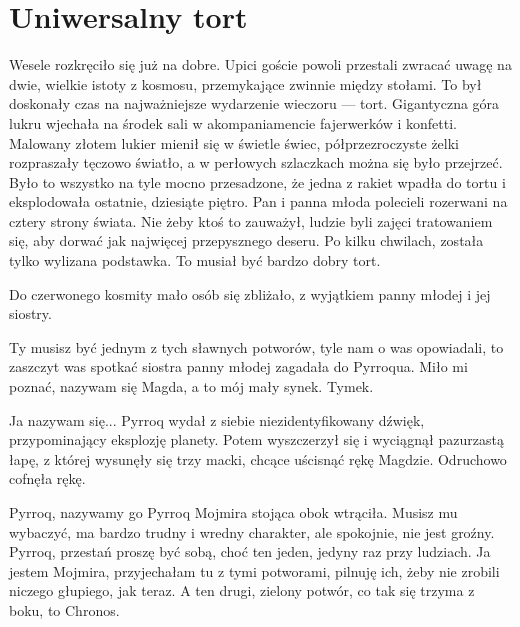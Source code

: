 \chapter{Uniwersalny tort}


Wesele rozkręciło się już na dobre. 
Upici goście powoli przestali zwracać uwagę na dwie, wielkie istoty z kosmosu, przemykające zwinnie między stołami.
To był doskonały czas na najważniejsze wydarzenie wieczoru --- tort.
Gigantyczna góra lukru wjechała na środek sali w akompaniamencie fajerwerków i konfetti. 
Malowany złotem lukier mienił się w świetle świec, półprzezroczyste żelki rozpraszały tęczowo światło, a w perłowych szlaczkach można się było przejrzeć.
Było to wszystko na tyle mocno przesadzone, że jedna z rakiet wpadła do tortu i eksplodowała ostatnie, dziesiąte piętro.
Pan i panna młoda polecieli rozerwani na cztery strony świata.
Nie żeby ktoś to zauważył, ludzie byli zajęci tratowaniem się, aby dorwać jak najwięcej przepysznego deseru. 
Po kilku chwilach, została tylko wylizana podstawka. To musiał być bardzo dobry tort.

Do czerwonego kosmity mało osób się zbliżało, z wyjątkiem panny młodej i jej siostry.

\ds{} Ty musisz być jednym z tych sławnych potworów, tyle nam o was opowiadali, to zaszczyt was spotkać \dm{} siostra panny młodej zagadała do Pyrroqua. \dm{}
Miło mi poznać, nazywam się Magda, a to mój mały synek. Tymek. \de{}

\ds{} Ja nazywam się... \dm{} Pyrroq wydał z siebie niezidentyfikowany dźwięk, przypominający eksplozję planety.
Potem wyszczerzył się i wyciągnął pazurzastą łapę, z której wysunęły się trzy macki, chcące uścisnąć rękę Magdzie. Odruchowo cofnęła rękę. \de{}

\ds{} Pyrroq, nazywamy go Pyrroq \dm{} Mojmira stojąca obok wtrąciła. \dm{} Musisz mu wybaczyć, ma bardzo trudny i wredny charakter, ale spokojnie, nie jest groźny. 
Pyrroq, przestań proszę być sobą, choć ten jeden, jedyny raz przy ludziach.
Ja jestem Mojmira, przyjechałam tu z tymi potworami, pilnuję ich, żeby nie zrobili niczego głupiego, jak teraz. 
A ten drugi, zielony potwór, co tak się trzyma z boku, to Chronos. \de{}

